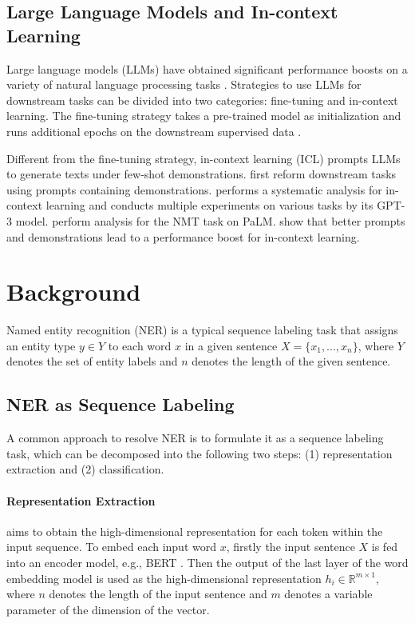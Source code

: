 \documentclass[11pt]{article}
\begin{document}
\subsection{Large Language Models and In-context Learning}
Large language models (LLMs) \cite{brown2020language,rae2021scaling,smith2022using,hoffmann2022training,chowdhery2022palm} have obtained significant performance boosts on a variety of natural language processing tasks \cite{hegselmann2022tabllm,vilar2022prompting,perez2021true,pietrzak2021story,wei2021finetuned}. 
Strategies to use LLMs for downstream tasks can be divided into two categories:  
fine-tuning and in-context learning. 
The fine-tuning strategy takes a pre-trained model as initialization and runs additional epochs on the downstream supervised data \cite{raffel2020exploring,gururangan2018annotation,roberts2020much,guu2020retrieval}. 

Different from the fine-tuning strategy, 
in-context learning (ICL) prompts LLMs to generate texts under few-shot demonstrations.  
 first reform downstream tasks using prompts containing demonstrations. 
  performs a systematic analysis for in-context learning and conducts multiple experiments on various tasks by its GPT-3 model. 
  perform analysis for the NMT task on PaLM. 
  show that better prompts and demonstrations lead to a performance boost for in-context learning. 

\section{Background}
\label{background_ner}

Named entity recognition (NER) is a typical sequence labeling task that assigns an entity type $y\in Y$ to each word $x$ in a given sentence $X=\{x_{1},...,x_{n}\}$, where $Y$ denotes the set of entity labels and $n$ denotes the length of the given sentence.

\subsection{NER as Sequence Labeling}
A common approach to resolve NER is to formulate it as a sequence labeling task, which can be decomposed into the following two steps: (1) representation extraction and (2) classification.


\paragraph{Representation Extraction}
 aims to obtain the high-dimensional representation for each token within the input sequence. 
To embed each input word $x$, firstly the input sentence $X$ is fed into an encoder model, e.g., BERT \cite{devlin2018bert}. Then the output of the last layer of the word embedding model is used as the high-dimensional representation $h_{i}\in \mathbb{R}^{m \times 1}$, where $n$ denotes the length of the input sentence and $m$ denotes a variable parameter of the dimension of the vector.
\end{document}
